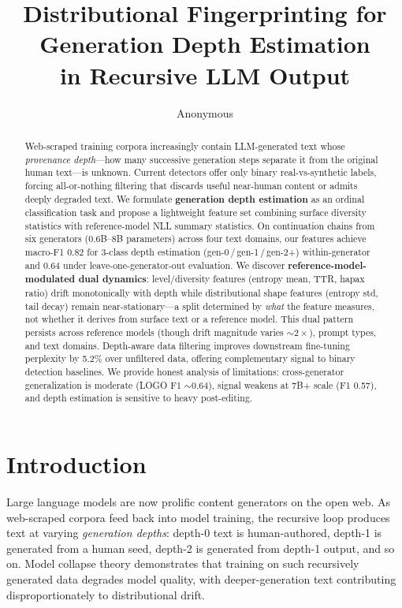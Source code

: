 \documentclass[letterpaper]{article}
\title{Distributional Fingerprinting for Generation Depth Estimation\\in Recursive LLM Output}
\author{Anonymous}
\date{}
\begin{document}
\maketitle

\begin{abstract}
Web-scraped training corpora increasingly contain LLM-generated text whose \emph{provenance depth}---how many successive generation steps separate it from the original human text---is unknown.
Current detectors offer only binary real-vs-synthetic labels, forcing all-or-nothing filtering that discards useful near-human content or admits deeply degraded text.
We formulate \textbf{generation depth estimation} as an ordinal classification task and propose a lightweight feature set combining surface diversity statistics with reference-model NLL summary statistics.
On continuation chains from six generators (0.6B--8B parameters) across four text domains, our features achieve macro-F1 0.82 for 3-class depth estimation (gen-0\,/\,gen-1\,/\,gen-2+) within-generator and 0.64 under leave-one-generator-out evaluation.
We discover \textbf{reference-model-modulated dual dynamics}: level/diversity features (entropy mean, TTR, hapax ratio) drift monotonically with depth while distributional shape features (entropy std, tail decay) remain near-stationary---a split determined by \emph{what} the feature measures, not whether it derives from surface text or a reference model.
This dual pattern persists across reference models (though drift magnitude varies ${\sim}2\times$), prompt types, and text domains.
Depth-aware data filtering improves downstream fine-tuning perplexity by 5.2\% over unfiltered data, offering complementary signal to binary detection baselines.
We provide honest analysis of limitations: cross-generator generalization is moderate (LOGO F1 ${\sim}$0.64), signal weakens at 7B+ scale (F1 0.57), and depth estimation is sensitive to heavy post-editing.
\end{abstract}

\section{Introduction}
\label{sec:intro}

Large language models are now prolific content generators on the open web.
As web-scraped corpora feed back into model training, the recursive loop produces text at varying \emph{generation depths}: depth-0 text is human-authored, depth-1 is generated from a human seed, depth-2 is generated from depth-1 output, and so on.
Model collapse theory demonstrates that training on such recursively generated data degrades model quality, with deeper-generation text contributing disproportionately to distributional drift.
\end{document}
